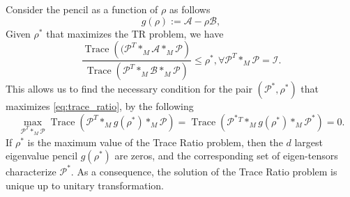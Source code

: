 \documentclass{siamltex}
\begin{document}
\noindent
Consider the pencil as a function of $\rho$ as follows
\begin{equation*}
g(\rho):=\mathcal{A} - \rho \mathcal{B},
\end{equation*}
Given $\rho^*$ that maximizes the TR problem, we have
\begin{equation*}
\dfrac{\operatorname{Trace}\left((\mathcal{P}^T *_M \mathcal{A} *_M \mathcal{P}\right)}{\operatorname{Trace}\left(\mathcal{P}^T *_M \mathcal{B} *_M \mathcal{P}\right)} \leq \rho^*, \forall \mathcal{P}^T *_M \mathcal{P}=\mathcal{I}.
\end{equation*}
\noindent
This allows us to find the necessary condition for the pair $(\mathcal{P}^*,\rho^*)$ that maximizes \ref{eq:trace_ratio}, by the following
\begin{equation} \label{eq:trace_ratio_necessary}
\max_{\mathcal{P}^T *_M \mathcal{P}} 
\operatorname{Trace}\left(\mathcal{P}^T *_M g(\rho^*) *_M \mathcal{P}\right)= \operatorname{Trace}\left(\mathcal{P}^*{^T} *_M g(\rho^*) *_M \mathcal{P}^*\right)=0.
\end{equation}
If $\rho^*$ is the maximum value of the Trace Ratio problem, then the $d$ largest eigenvalue pencil $g(\rho^*)$ are zeros, and the corresponding set of eigen-tensors characterize $\mathcal{P}^*$. As a consequence, the solution of the Trace Ratio problem is unique up to unitary transformation.
\end{document}
